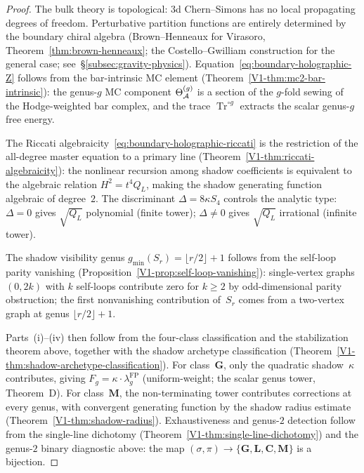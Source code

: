 \begin{proof}
The bulk theory is topological: $3$d Chern--Simons has no
local propagating degrees of freedom. Perturbative partition
functions are entirely determined by the boundary chiral
algebra (Brown--Henneaux for Virasoro,
Theorem~\ref{thm:brown-henneaux};
the Costello--Gwilliam construction for the general case;
see~\S\ref{subsec:gravity-physics}).
Equation~\eqref{eq:boundary-holographic-Z} follows from the
bar-intrinsic MC element
(Theorem~\ref*{V1-thm:mc2-bar-intrinsic}): the genus-$g$
MC component $\Theta_{\mathcal{A}}^{(g)}$ is a section of the
$g$-fold sewing of the Hodge-weighted bar complex, and the
trace $\operatorname{Tr}^{\circ g}$ extracts the scalar
genus-$g$ free energy.

The Riccati algebraicity~\eqref{eq:boundary-holographic-riccati}
is the restriction of the all-degree master equation to a primary
line
(Theorem~\ref*{V1-thm:riccati-algebraicity}): the nonlinear
recursion among shadow coefficients is equivalent to the
algebraic relation $H^2 = t^4 Q_L$, making the shadow
generating function algebraic of degree~$2$. The discriminant
$\Delta = 8\kappa S_4$ controls the analytic type: $\Delta = 0$
gives $\sqrt{Q_L}$ polynomial \textup{(}finite tower\textup{)};
$\Delta \neq 0$ gives $\sqrt{Q_L}$ irrational
\textup{(}infinite tower\textup{)}.

The shadow visibility genus
$g_{\min}(S_r) = \lfloor r/2 \rfloor + 1$ follows from the
self-loop parity vanishing
(Proposition~\ref*{V1-prop:self-loop-vanishing}): single-vertex
graphs $(0, 2k)$ with $k$ self-loops contribute zero for
$k \geq 2$ by odd-dimensional parity obstruction; the first
nonvanishing contribution of~$S_r$ comes from a two-vertex
graph at genus $\lfloor r/2 \rfloor + 1$.

Parts~(i)--(iv) then follow from the four-class classification
and the stabilization theorem above, together with the shadow
archetype classification
(Theorem~\ref*{V1-thm:shadow-archetype-classification}).
For class~$\mathbf{G}$, only the quadratic shadow~$\kappa$
contributes, giving
$F_g = \kappa \cdot \lambda_g^{\mathrm{FP}}$
\textup{(}uniform-weight; the scalar genus tower, Theorem~D\textup{)}.
For class~$\mathbf{M}$, the non-terminating tower contributes
corrections at every genus, with convergent generating function
by the shadow radius estimate
(Theorem~\ref*{V1-thm:shadow-radius}).
Exhaustiveness and genus-$2$ detection follow from the
single-line dichotomy
(Theorem~\ref*{V1-thm:single-line-dichotomy})
and the genus-$2$ binary diagnostic above: the map
$(\sigma, \pi) \to \{\mathbf{G}, \mathbf{L},
\mathbf{C}, \mathbf{M}\}$ is a bijection.
\end{proof}


